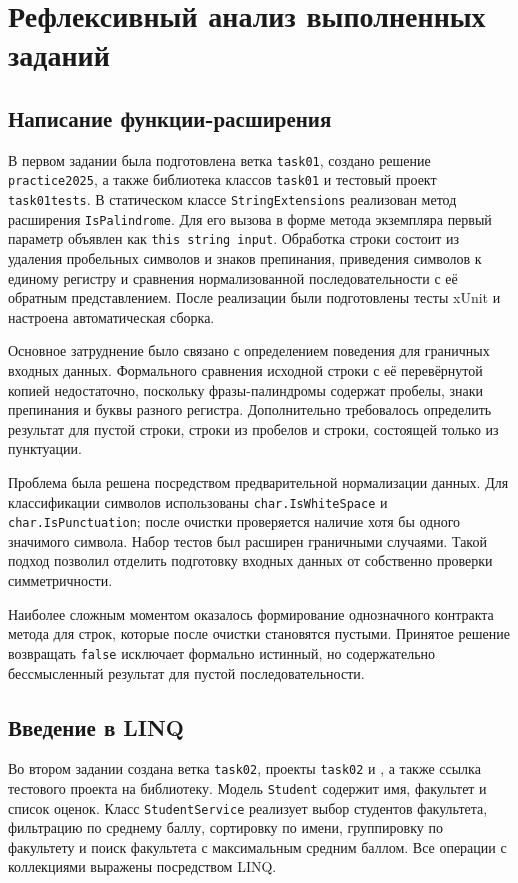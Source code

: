 \clearpage
\section{Рефлексивный анализ выполненных заданий}

\subsection{Написание функции-расширения}

В первом задании была подготовлена ветка \texttt{task01}, создано решение \texttt{practice2025}, а также библиотека классов \texttt{task01} и тестовый проект \texttt{task01tests}. В статическом классе \texttt{StringExtensions} реализован метод расширения \texttt{IsPalindrome}. Для его вызова в форме метода экземпляра первый параметр объявлен как \texttt{this string input}. Обработка строки состоит из удаления пробельных символов и знаков препинания, приведения символов к единому регистру и сравнения нормализованной последовательности с её обратным представлением. После реализации были подготовлены тесты xUnit и настроена автоматическая сборка.

Основное затруднение было связано с определением поведения для граничных входных данных. Формального сравнения исходной строки с её перевёрнутой копией недостаточно, поскольку фразы-палиндромы содержат пробелы, знаки препинания и буквы разного регистра. Дополнительно требовалось определить результат для пустой строки, строки из пробелов и строки, состоящей только из пунктуации.

Проблема была решена посредством предварительной нормализации данных. Для классификации символов использованы \texttt{char.IsWhiteSpace} и \texttt{char.IsPunctuation}; после очистки проверяется наличие хотя бы одного значимого символа. Набор тестов был расширен граничными случаями. Такой подход позволил отделить подготовку входных данных от собственно проверки симметричности.

Наиболее сложным моментом оказалось формирование однозначного контракта метода для строк, которые после очистки становятся пустыми. Принятое решение возвращать \texttt{false} исключает формально истинный, но содержательно бессмысленный результат для пустой последовательности.

\subsection{Введение в LINQ}

Во втором задании создана ветка \texttt{task02}, проекты \texttt{task02} и , а также ссылка тестового проекта на библиотеку. Модель \texttt{Student} содержит имя, факультет и список оценок. Класс \texttt{StudentService} реализует выбор студентов факультета, фильтрацию по среднему баллу, сортировку по имени, группировку по факультету и поиск факультета с максимальным средним баллом. Все операции с коллекциями выражены посредством LINQ.

